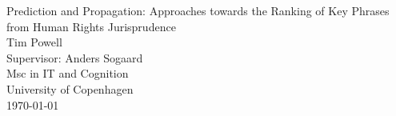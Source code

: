 \documentclass{book}
\begin{document}
\begin{titlepage}
\vfill
\centering
{\Huge Prediction and Propagation: Approaches towards the Ranking of Key Phrases from Human Rights Jurisprudence}\\[1cm]
{\Large Tim Powell}\\[0.6cm]
{\small Supervisor: Anders Sogaard}\\
{\small Msc in IT and Cognition}\\
{\small University of Copenhagen}\\

\today
\vfill
\end{titlepage}
\end{document}
